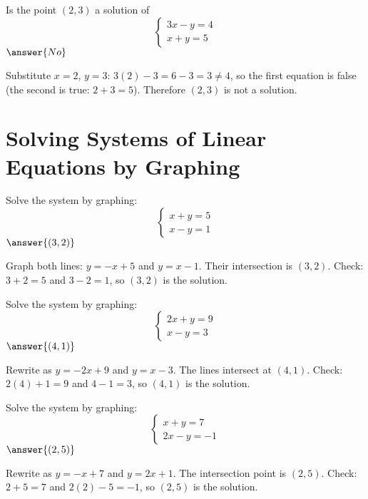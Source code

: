 \documentclass{ximera}
\begin{document}
\begin{problem}
Is the point $(2,3)$ a solution of
\[
\begin{cases}
3x - y = 4\\
x + y = 5
\end{cases}
\]
$\answer{No}$
\begin{feedback}
Substitute $x=2$, $y=3$: $3(2)-3=6-3=3\neq4$, so the first equation is false (the second is true: $2+3=5$). Therefore $(2,3)$ is not a solution.
\end{feedback}
\end{problem}


\section*{Solving Systems of Linear Equations by Graphing}

\begin{problem}
Solve the system by graphing:
\[
\begin{cases}
x + y = 5\\
x - y = 1
\end{cases}
\]
$\answer{(3,2)}$
\begin{feedback}
Graph both lines: $y = -x + 5$ and $y = x - 1$. Their intersection is $(3,2)$. Check: $3+2=5$ and $3-2=1$, so $(3,2)$ is the solution.
\end{feedback}
\end{problem}

\begin{problem}
Solve the system by graphing:
\[
\begin{cases}
2x + y = 9\\
x - y = 3
\end{cases}
\]
$\answer{(4,1)}$
\begin{feedback}
Rewrite as $y = -2x + 9$ and $y = x - 3$. The lines intersect at $(4,1)$. Check: $2(4)+1=9$ and $4-1=3$, so $(4,1)$ is the solution.
\end{feedback}
\end{problem}

\begin{problem}
Solve the system by graphing:
\[
\begin{cases}
x + y = 7\\
2x - y = -1
\end{cases}
\]
$\answer{(2,5)}$
\begin{feedback}
Rewrite as $y = -x + 7$ and $y = 2x + 1$. The intersection point is $(2,5)$. Check: $2+5=7$ and $2(2)-5=-1$, so $(2,5)$ is the solution.
\end{feedback}
\end{problem}
\end{document}
